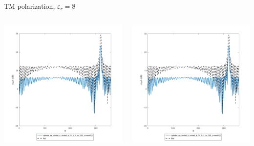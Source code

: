 
\begin{frame}{TM polarization, $\varepsilon_r=8$}

\begin{columns}

\includegraphics[width=\linewidth]{results/FF/cylD_01_H_1_M_025_X/epr8_TM.png}


\includegraphics[width=\linewidth]{results/FF/cylD_01_H_1_M_025_Y/epr8_TM.png}


\end{columns}
\end{frame}
